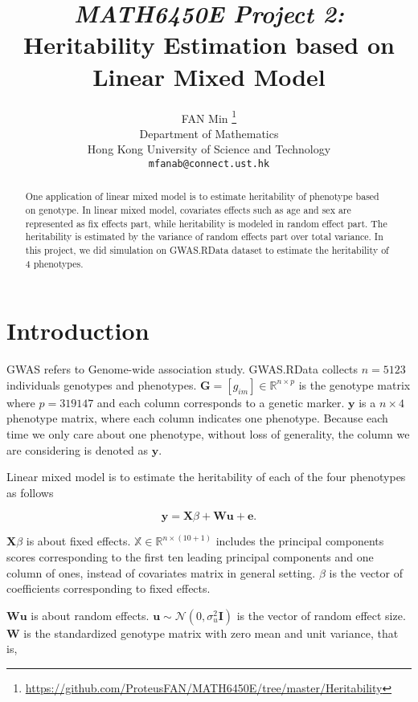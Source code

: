 \documentclass{article}
\title{\emph{MATH6450E Project 2:} Heritability Estimation based on Linear Mixed Model}
\author{%
  FAN Min
  \thanks{\url{https://github.com/ProteusFAN/MATH6450E/tree/master/Heritability}} \\
  Department of Mathematics\\
  Hong Kong University of Science and Technology\\
  \texttt{mfanab@connect.ust.hk} \\
}
\begin{document}

\maketitle

\begin{abstract}
	One application of linear mixed model is to estimate heritability of phenotype based on genotype. In linear mixed model, covariates effects such as age and sex are represented as fix effects part, while heritability is modeled in random effect part. The heritability is estimated by the variance of random effects part over total variance. In this project, we did simulation on GWAS.RData dataset to estimate the heritability of 4 phenotypes.
\end{abstract}

\section{Introduction}

GWAS refers to Genome-wide association study. GWAS.RData collects $ n = 5123 $ individuals genotypes and phenotypes. $ \mathbf{G} = [g_{im}] \in \mathbb{R}^{n \times p} $ is the genotype matrix where $ p = 319147 $ and each column corresponds to a genetic marker. $ \mathbf{y} $ is a $ n \times 4 $ phenotype matrix, where each column indicates one phenotype. Because each time we only care about one phenotype, without loss of generality, the column we are considering is denoted as $ \mathbf{y} $.

Linear mixed model is to estimate the heritability of each of the four phenotypes as follows

\begin{equation}
	\mathbf{y} = \mathbf{X} \beta  + \mathbf{W u} + \mathbf{e}.
\end{equation}

$ \mathbf{X} \beta $ is about fixed effects. $ \mathbb{X} \in \mathbb{R}^{n \times (10 +1) } $ includes the principal components scores corresponding to the first ten leading principal components and one column of ones, instead of covariates matrix in general setting. $ \beta $ is the vector of coefficients corresponding to fixed effects.

$ \mathbf{W u} $ is about random effects. $ \mathbf{u} \sim \mathcal{N} (0, \sigma^{2}_{u} \mathbf{I}) $ is the vector of random effect size. $ \mathbf{W} $ is the standardized genotype matrix with zero mean and unit variance, that is,
\end{document}

